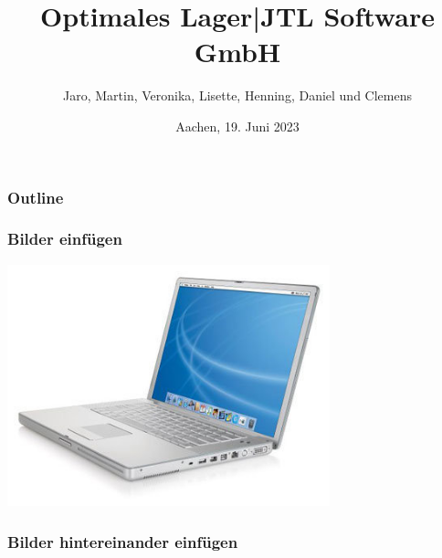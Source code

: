 \documentclass{rwth-beamer}
\title{Optimales Lager\enspace|\enspace JTL Software GmbH}
\author{Jaro, Martin, Veronika, Lisette, Henning, Daniel und Clemens}
\date{Aachen, 19. Juni 2023}
\begin{document}
\maketitle

\begin{frame}
	\frametitle{Outline}
	\tableofcontents
\end{frame}


\begin{frame}[t]  %
	\frametitle{Bilder einfügen}
	\begin{center}
		\includegraphics[width=0.7\textwidth]{../figs/z_laptop}
	\end{center}
\end{frame}

\begin{frame}[t]
	\frametitle{Bilder hintereinander einfügen}
	\begin{center}
	\end{center}
\end{frame}
\end{document}
